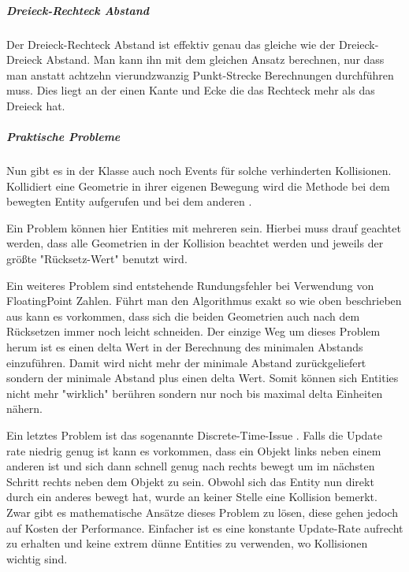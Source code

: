\subparagraph{Dreieck-Rechteck Abstand}

Der Dreieck-Rechteck Abstand ist effektiv genau das gleiche wie der Dreieck-Dreieck Abstand. Man kann ihn mit dem gleichen Ansatz berechnen, nur dass man anstatt achtzehn vierundzwanzig Punkt-Strecke Berechnungen durchführen muss. Dies liegt an der einen Kante und Ecke die das Rechteck mehr als das Dreieck hat.

\subparagraph{Praktische Probleme}

Nun gibt es in der Klasse  auch noch Events für solche verhinderten Kollisionen. Kollidiert eine Geometrie in ihrer eigenen Bewegung wird die Methode  bei dem bewegten Entity aufgerufen und bei dem anderen .

Ein Problem können hier Entities mit mehreren  sein. Hierbei muss drauf geachtet werden, dass alle Geometrien in der Kollision beachtet werden und jeweils der größte "Rücksetz-Wert" benutzt wird.

Ein weiteres Problem sind entstehende Rundungsfehler bei Verwendung von FloatingPoint Zahlen. Führt man den Algorithmus exakt so wie oben beschrieben aus kann es vorkommen, dass sich die beiden Geometrien auch nach dem Rücksetzen immer noch leicht schneiden. Der einzige Weg um dieses Problem herum ist es einen delta Wert in der Berechnung des minimalen Abstands einzuführen.\cite[S 18]{KRAY} Damit wird nicht mehr der minimale Abstand zurückgeliefert sondern der minimale Abstand plus einen delta Wert. Somit können sich Entities nicht mehr "wirklich" berühren sondern nur noch bis maximal delta Einheiten nähern.

Ein letztes Problem ist das sogenannte Discrete-Time-Issue \cite[S 503]{DGIJ}. Falls die Update rate niedrig genug ist kann es vorkommen, dass ein Objekt links neben einem anderen ist und sich dann schnell genug nach rechts bewegt um im nächsten Schritt rechts neben dem Objekt zu sein. Obwohl sich das Entity nun direkt durch ein anderes bewegt hat, wurde an keiner Stelle eine Kollision bemerkt. Zwar gibt es mathematische Ansätze dieses Problem zu lösen, diese gehen jedoch auf Kosten der Performance.\cite[S 11ff]{KRAY} Einfacher ist es eine konstante Update-Rate aufrecht zu erhalten und keine extrem dünne Entities zu verwenden, wo Kollisionen wichtig sind.


